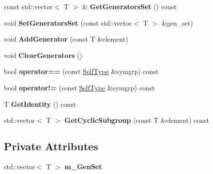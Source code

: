 \begin{DoxyCompactItemize}
\item 
\hypertarget{classcSymmetricRep_af90591a8af82e61668da036efa04a5fd}{
const std\-::vector$<$ \-T $>$ \& {\bfseries \-Get\-Generators\-Set} () const }
\label{classcSymmetricRep_af90591a8af82e61668da036efa04a5fd}

\item 
\hypertarget{classcSymmetricRep_a10df8259eeafac4f03c8d7b251f37dfb}{
void {\bfseries \-Set\-Generators\-Set} (const std\-::vector$<$ \-T $>$ \&gen\-\_\-set)}
\label{classcSymmetricRep_a10df8259eeafac4f03c8d7b251f37dfb}

\item 
\hypertarget{classcSymmetricRep_a59125541fe5801e2073cacb54ed879d8}{
void {\bfseries \-Add\-Generator} (const \-T \&element)}
\label{classcSymmetricRep_a59125541fe5801e2073cacb54ed879d8}

\item 
\hypertarget{classcSymmetricRep_a37c8cab52b7ef4aa4b83f3ef203036ef}{
void {\bfseries \-Clear\-Generators} ()}
\label{classcSymmetricRep_a37c8cab52b7ef4aa4b83f3ef203036ef}

\item 
\hypertarget{classcSymmetricRep_a30639c704b01408475c9fd4a100d738d}{
bool {\bfseries operator==} (const \hyperlink{classcSymmetricRep}{\-Self\-Type} \&symgrp) const }
\label{classcSymmetricRep_a30639c704b01408475c9fd4a100d738d}

\item 
\hypertarget{classcSymmetricRep_a77bcf4f11ff92c57aa6626c075bf3355}{
bool {\bfseries operator!=} (const \hyperlink{classcSymmetricRep}{\-Self\-Type} \&symgrp) const }
\label{classcSymmetricRep_a77bcf4f11ff92c57aa6626c075bf3355}

\item 
\hypertarget{classcSymmetricRep_a5182c5dcf4247c03a7e0de001e7c1cf3}{
\-T {\bfseries \-Get\-Identity} () const }
\label{classcSymmetricRep_a5182c5dcf4247c03a7e0de001e7c1cf3}

\item 
\hypertarget{classcSymmetricRep_ad8420870de49c97154a4afd71752c071}{
std\-::vector$<$ \-T $>$ {\bfseries \-Get\-Cyclic\-Subgroup} (const \-T \&element) const }
\label{classcSymmetricRep_ad8420870de49c97154a4afd71752c071}

\end{DoxyCompactItemize}
\subsection*{\-Private \-Attributes}
\begin{DoxyCompactItemize}
\item 
\hypertarget{classcSymmetricRep_ab9afa5a928d6fba3c560e0245ab5d0e4}{
std\-::vector$<$ \-T $>$ {\bfseries m\-\_\-\-Gen\-Set}}
\label{classcSymmetricRep_ab9afa5a928d6fba3c560e0245ab5d0e4}

\end{DoxyCompactItemize}
